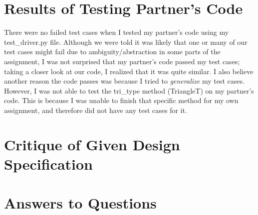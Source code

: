 \documentclass[12pt]{article}
\begin{document}
\section{Results of Testing Partner's Code}

There were no failed test cases when I tested my partner's code using my test\_driver.py file. Although we were told it was likely that one or many of our test cases might fail due to ambiguity/abstraction in some parts of the assignment, I was not surprised that my partner's code passed my test cases; taking a closer look at our code, I realized that it was quite similar. I also believe another reason the code passes was because I tried to \emph{generalize} my test cases. However, I was not able to test the tri\_type method (TriangleT) on my partner's code. This is because I was unable to finish that specific method for my own assignment, and therefore did not have any test cases for it. 

\section{Critique of Given Design Specification}



\section{Answers to Questions}
\end{document}
